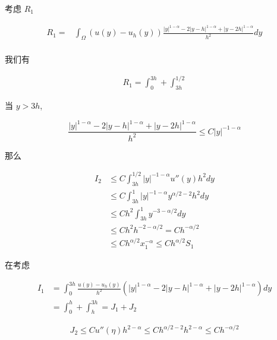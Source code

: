 \documentclass{ctexart}
\begin{document}
考虑 \(R_1\)

\begin{equation}
    \begin{aligned}
        R_1 = & \int_\Omega (u(y) - u_h(y)) \frac{ |y|^{1-\alpha} - 2|y-h|^{1-\alpha} + |y-2h|^{1-\alpha} }{h^2} dy \\
    \end{aligned}
\end{equation}


我们有

\begin{equation}
    \begin{aligned}
        R_1 = \int_0^{3h} + \int_{3h}^{1/2}
    \end{aligned}
\end{equation}

当 \(y>3h\),

\begin{equation}
    \frac{ |y|^{1-\alpha} - 2|y-h|^{1-\alpha} + |y-2h|^{1-\alpha} }{h^2} \le C |y|^{-1-\alpha}
\end{equation}

那么

\begin{equation}
    \begin{aligned}
        I_2 & \le  C \int_{3h}^{1/2} |y|^{-1-\alpha} u''(y) h^2 dy       \\
            & \le  C \int_{3h}^{1} |y|^{-1-\alpha} y^{\alpha/2-2} h^2 dy \\
            & \le C h^{2}  \int_{3h}^{1} y^{-3-\alpha/2} dy              \\
            & \le C h^{2} h^{-2-\alpha/2} = C h^{-\alpha/2}              \\
            & \le C h^{\alpha/2} x_1^{-\alpha} \le C h^{\alpha/2} S_1
    \end{aligned}
\end{equation}

在考虑

\begin{equation}
    \begin{aligned}
        I_1 & = \int_0^{3h}  \frac{ u(y) - u_h(y) }{h^2} (|y|^{1-\alpha} - 2|y-h|^{1-\alpha} + |y-2h|^{1-\alpha}) dy \\
            & = \int_0^h + \int_h^{3h} = J_1 + J_2
    \end{aligned}
\end{equation}

\begin{equation}
    J_2 \le C u''(\eta) h^{2-\alpha} \le C h^{\alpha/2-2} h^{2-\alpha} \le C h^{-\alpha/2}
\end{equation}
\end{document}
